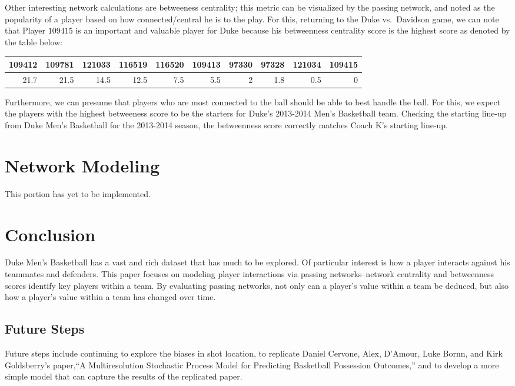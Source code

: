 \documentclass[12pt,twoside]{dukestatscithesis}
\theoremstyle{definition}
\theoremstyle{definition}
\theoremstyle{definition}
\theoremstyle{remark}
\begin{document}
Other interesting network calculations are betweeness centrality; this
metric can be visualized by the passing network, and noted as the
popularity of a player based on how connected/central he is to the play.
For this, returning to the Duke vs.~Davidson game, we can note that
Player \(109415\) is an important and valuable player for Duke because
his betweenness centrality score is the highest score as denoted by the
table below:
\begin{tabular}{r|r|r|r|r|r|r|r|r|r}
\hline
109412 & 109781 & 121033 & 116519 & 116520 & 109413 & 97330 & 97328 & 121034 & 109415\\
\hline
21.7 & 21.5 & 14.5 & 12.5 & 7.5 & 5.5 & 2 & 1.8 & 0.5 & 0\\
\hline
\end{tabular}
Furthermore, we can presume that players who are most connected to the
ball should be able to best handle the ball. For this, we expect the
players with the highest betweeness score to be the starters for Duke's
2013-2014 Men's Basketball team. Checking the starting line-up from Duke
Men's Basketball for the 2013-2014 season, the betweenness score
correctly matches Coach K's starting line-up.

\chapter{Network Modeling}\label{network-modeling}

This portion has yet to be implemented.

\chapter{Conclusion}\label{conclusion}

Duke Men's Basketball has a vast and rich dataset that has much to be
explored. Of particular interest is how a player interacts against his
teammates and defenders. This paper focuses on modeling player
interactions via passing networks--network centrality and betweenness
scores identify key players within a team. By evaluating passing
networks, not only can a player's value within a team be deduced, but
also how a player's value within a team has changed over time.

\section{Future Steps}\label{future-steps}

Future steps include continuing to explore the biases in shot location,
to replicate Daniel Cervone, Alex, D'Amour, Luke Bornn, and Kirk
Goldsberry's paper,``A Multiresolution Stochastic Process Model for
Predicting Basketball Possession Outcomes,'' and to develop a more
simple model that can capture the results of the replicated paper.
\end{document}
